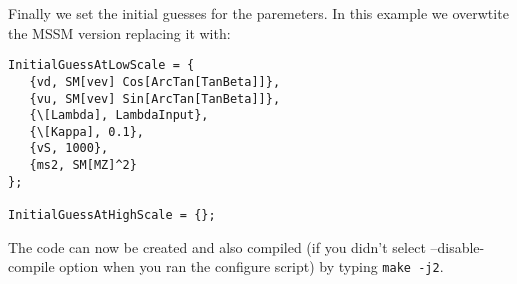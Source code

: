 \documentclass[final,3p,times,pdflatex]{elsarticle}
\newcommand{\code}[1]{\lstinline|#1|}  %
\begin{document}
\begin{enumerate}
\begin{enumerate}
Finally we set the initial guesses for the paremeters.  In this example we overwtite the MSSM version replacing it with:
 \begin{lstlisting} 
InitialGuessAtLowScale = {
   {vd, SM[vev] Cos[ArcTan[TanBeta]]},
   {vu, SM[vev] Sin[ArcTan[TanBeta]]},
   {\[Lambda], LambdaInput},
   {\[Kappa], 0.1},
   {vS, 1000},
   {ms2, SM[MZ]^2}
};

InitialGuessAtHighScale = {};
 \end{lstlisting}

The code can now be created and also compiled (if you didn't select --disable-compile option when you ran the configure script) by typing \code{make -j2}.


 \end{enumerate}   

\end{enumerate}   
\end{document}
